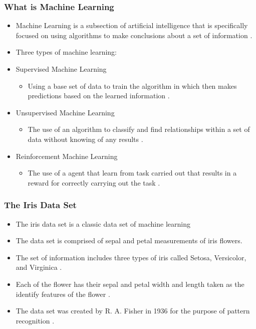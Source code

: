 \documentclass{beamer}
\begin{document}
\begin{frame}
\frametitle{What is Machine Learning}
\begin{itemize}
\item Machine Learning is a subsection of artificial intelligence that is specifically focused on using algorithms to make conclusions about a set of information \cite{pythonML}.
\item Three types of machine learning:
\item Supervised Machine Learning
    \begin{itemize}
        \item Using a base set of data to train the algorithm in which then makes predictions based on the learned information \cite{pythonML}.
    \end{itemize}
\item Unsupervised Machine Learning
    \begin{itemize}
        \item The use of an algorithm to classify and find relationships within a set of data without knowing of any results \cite{pythonML}.
    \end{itemize}
\item Reinforcement Machine Learning
    \begin{itemize}
    \item The use of a agent that learn from task carried out that results in a reward for correctly carrying out the task \cite{pythonML}.
    \end{itemize}
\end{itemize}
\end{frame}

\begin{frame}
\frametitle{The Iris Data Set}
\begin{itemize}
    \item The iris data set is a classic data set of machine learning
    \item The data set is comprised of sepal and petal measurements of iris flowers\cite{IrisData}.
    \item The set of information includes three types of iris called Setosa, Versicolor, and Virginica  \cite{IrisData}.
    \item Each of the flower has their sepal and petal width and length taken as the identify features of the flower  \cite{IrisData}.
    \item The data set was created by R. A. Fisher in 1936 for the purpose of pattern recognition  \cite{IrisData}.
\end{itemize}
\end{frame}
\end{document}
